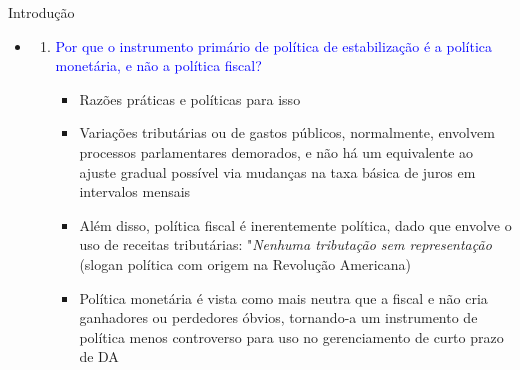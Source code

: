 \documentclass[10pt]{beamer}
\begin{document}
\begin{frame}
    {Introdução}
    \begin{itemize}
        \item {}\bigskip
        \begin{enumerate}
            \item \textcolor{blue}{Por que o instrumento primário de política de estabilização é a política monetária, e não a política fiscal?}\medskip
            \begin{itemize}
                \item Razões práticas e políticas para isso\medskip
                \item Variações tributárias ou de gastos públicos, normalmente, envolvem processos parlamentares demorados, e não há um equivalente ao ajuste gradual possível via mudanças na taxa básica de juros em intervalos mensais\medskip
                \item Além disso, política fiscal é inerentemente política, dado que envolve o uso de receitas tributárias: "\emph{Nenhuma tributação sem representação} (slogan política com origem na Revolução Americana)\medskip
                \item Política monetária é vista como mais neutra que a fiscal e não cria ganhadores ou perdedores óbvios, tornando-a um instrumento de política menos controverso para uso no gerenciamento de curto prazo de DA
            \end{itemize}
        \end{enumerate}        
    \end{itemize}
\end{frame}
\end{document}
